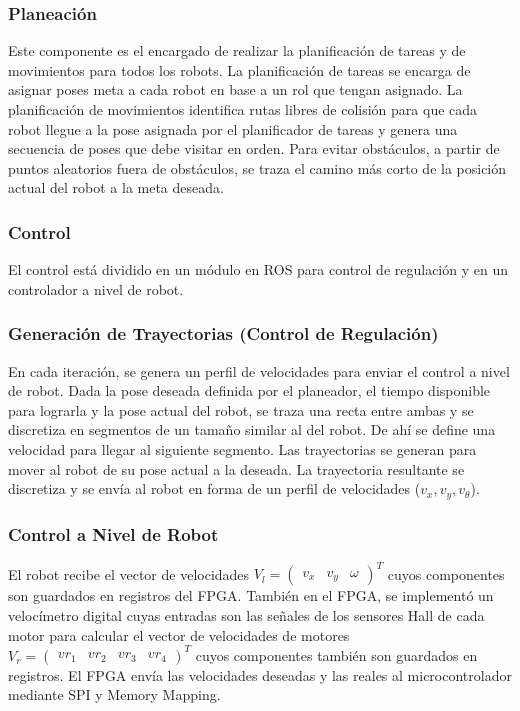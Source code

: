\documentclass[twocolumn,10pt]{amrob}
\begin{document}
\subsubsection*{Planeación}
\label{subsec:Planificacion}
Este componente es el encargado de realizar la planificación de tareas y de movimientos para todos los robots. La planificación de tareas se encarga de asignar poses meta a cada robot en base a un rol que tengan asignado. La planificación de movimientos identifica rutas libres de colisión para que cada robot llegue a la pose asignada por el planificador de tareas y genera una secuencia de poses que debe visitar en orden. Para evitar obstáculos, a partir de puntos aleatorios fuera de obstáculos, se traza el camino más corto de la posición actual del robot a la meta deseada. 

\subsubsection*{Control}
\label{subsec:Ctrl}
El control está dividido en un módulo en ROS para control de regulación y en un controlador a nivel de robot.

\subsubsection*{Generación de Trayectorias (Control de Regulación)}
En cada iteración, se genera un perfil de velocidades para enviar el control a nivel de robot. Dada la pose deseada definida por el planeador, el tiempo disponible para lograrla y la pose actual del robot, se traza una recta entre ambas y se discretiza en segmentos de un tamaño similar al del robot. De ahí se define una velocidad para llegar al siguiente segmento.
 Las trayectorias se generan para mover al robot de su pose actual a la deseada. La trayectoria resultante se discretiza y se envía al robot en forma de un perfil de velocidades ($v_x,v_y,v_\theta$).
\subsubsection*{Control a Nivel de Robot}
\label{sec:comunicaciones}
El robot recibe el vector de velocidades $V_l= \begin{pmatrix} v_x & v_y & \omega \end{pmatrix}^{T}$ cuyos componentes son guardados en registros del FPGA. También en el FPGA, se implementó un velocímetro digital cuyas entradas son las señales de los sensores Hall de cada motor para calcular el vector de velocidades de motores 
$V_r= \begin {pmatrix} vr_1 & vr_2 & vr_3 & vr_4 \end{pmatrix}^{T} $
cuyos componentes también son guardados en registros. El FPGA envía las velocidades deseadas y las reales al microcontrolador mediante SPI y Memory Mapping. 
\end{document}
